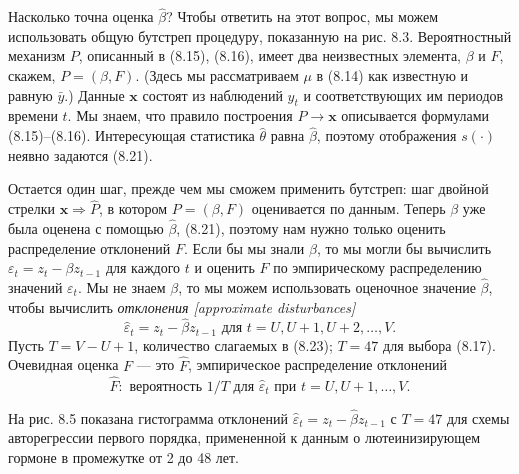 Насколько точна оценка $\hat{\beta}$? Чтобы ответить на этот вопрос, мы можем использовать общую бутстреп процедуру, показанную на рис. 8.3. Вероятностный механизм $P$, описанный в (8.15), (8.16), имеет два неизвестных элемента, $\beta$ и $F$, скажем, $P = (\beta, F)$. (Здесь мы рассматриваем $\mu$ в (8.14) как известную и равную $\bar{y}$.) Данные $\textbf{x}$ состоят из наблюдений $y_t$ и соответствующих им периодов времени $t$. Мы знаем, что правило построения $P \to \textbf{x}$ описывается формулами (8.15)--(8.16). Интересующая статистика $\hat{\theta}$ равна $\hat{\beta}$, поэтому отображения $s(\cdot)$ неявно задаются (8.21).

Остается один шаг, прежде чем мы сможем применить бутстреп: шаг двойной стрелки $\textbf{x} \Rightarrow \hat{P}$, в котором $P = (\beta, F)$ оценивается по данным. Теперь $\beta$ уже была оценена с помощью $\hat{\beta}$, (8.21), поэтому нам нужно только оценить распределение отклонений $F$. Если бы мы знали $\beta$, то мы могли бы вычислить $\varepsilon_t = z_t - \beta z_{t-1}$ для каждого $t$ и оценить $F$ по эмпирическому распределению значений $\varepsilon_t$. Мы не знаем $\beta$, то мы можем использовать оценочное значение $\hat{\beta}$, чтобы вычислить \textit{отклонения [approximate disturbances]}
\begin{equation}
	\hat{\varepsilon}_t = z_t - \hat{\beta} z_{t-1} \text{ для } t = U, U + 1, U + 2, \ldots, V.
\end{equation}
Пусть $T = V - U + 1$, количество слагаемых в (8.23); $T = 47$ для выбора (8.17). Очевидная оценка $F$ --- это $\hat{F}$, эмпирическое распределение отклонений
\begin{equation}
	\hat{F}: \text{ вероятность } 1/T \text{ для } \hat{\varepsilon}_t \text{ при } t = U, U + 1, \ldots, V.
\end{equation}

На рис. 8.5 показана гистограмма отклонений $\hat{\varepsilon}_t = z_t - \hat{\beta} z_{t-1}$ с $T = 47$ для схемы авторегрессии первого порядка, примененной к данным о лютеинизирующем гормоне в промежутке от 2 до 48 лет.

